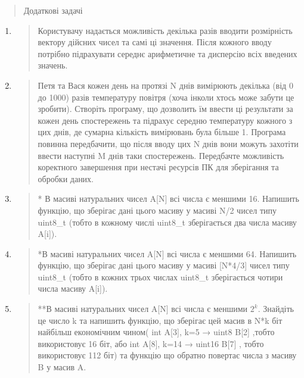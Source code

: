 \documentclass[]{article}
\begin{document}
\begin{quote}
Додаткові задачі
\end{quote}

\begin{enumerate}
\def\labelenumi{\arabic{enumi})}
\item
  \begin{quote}
  Користувачу надається можливість декілька разів вводити розмірність
  вектору дійсних чисел та самі ці значення. Після кожного вводу
  потрібно підрахувати середнє арифметичне та дисперсію всіх введених
  значень.
  \end{quote}
\item
  \begin{quote}
  Петя та Вася кожен день на протязі
  \protect\hypertarget{__DdeLink__55546_11145444801}{}{}N днів вимірюють
  декілька (від 0 до 1000) разів температуру повітря (хоча інколи хтось
  може забути це зробити). Створіть програму, що дозволить їм ввести ці
  результати за кожен день спостережень та підрахує середню температуру
  кожного з цих днів, де сумарна кількість вимірювань була більше 1.
  Програма повинна передбачити, що після вводу цих N днів вони можуть
  захотіти ввести наступні M днів таки спостережень. Передбачте
  можливість коректного завершення при нестачі ресурсів ПК для
  зберігання та обробки даних.
  \end{quote}
\item
  \begin{quote}
  * В масиві натуральних чисел A{[}N{]} всі числа є меншими 16. Напишить
  функцію, що зберігає дані цього масиву у масиві N/2 чисел типу
  uint8\_t (тобто в кожному числі uint8\_t зберігається два числа масиву
  A{[}i{]}).
  \end{quote}
\item
  \begin{quote}
  *В масиві натуральних чисел A{[}N{]} всі числа є меншими 64. Напишить
  функцію, що зберігає дані цього масиву у масиві {[}N*4/3{]} чисел типу
  uint8\_t (тобто в кожних трьох числах uint8\_t зберігається чотири
  числа масиву A{[}i{]}).
  \end{quote}
\item
  \begin{quote}
  **В масиві натуральних чисел A{[}N{]} всі числа є меншими \(2^{k}\).
  Знайдіть це число k та напишить функцію, що зберігає цей масив в N*k
  біт найбільш економічним чином( int A{[}3{]}, k=5 → uint8 B{[}2{]}
  ,тобто використовує 16 біт, або int A{[}8{]}, k=14 → uint16 B{[}7{]} ,
  тобто використовує 112 біт) та функцію що обратно повертає числа з
  масиву B у масив A.
  \end{quote}
\end{enumerate}
\end{document}

